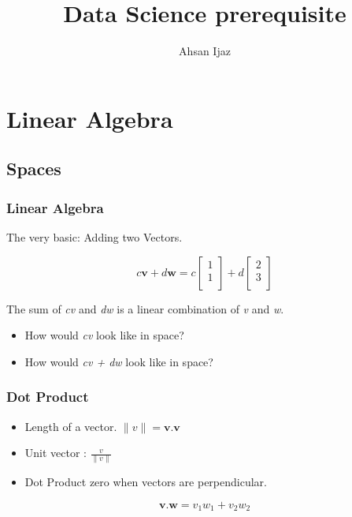 \documentclass{beamer}
\newtheorem{Key points}{Key points}
\begin{document}
\title[Linear Algebra Introduction]{Data Science prerequisite} 
\author{Ahsan Ijaz}
\date{}
 \frame{\titlepage}
\section{Linear Algebra}
\subsection{Spaces}
 \begin{frame}
   \frametitle{Linear Algebra}
   The very basic:
  Adding two Vectors.

   \begin{equation*}
     c\mathbf{v} +d\mathbf{w} = c\begin{bmatrix}
1\\ 
1\\ 
\end{bmatrix}+
d\begin{bmatrix}
2\\
3\\
\end{bmatrix}
   \end{equation*}
   \begin{definition}
     The sum of \emph{cv} and \emph{dw} is a linear combination of \emph{v} and \emph{w}.
   \end{definition}
   \begin{itemize}
   \item<2-> How would \emph{cv} look like in space?
   \item<3-> How would \emph{cv + dw} look like in space?
   \end{itemize}

 \end{frame}

 \begin{frame}
   \frametitle{Dot Product}
 \begin{itemize}
 \item Length of a vector. $\lVert{}v{}\rVert = \mathbf{v.v}$
\item Unit vector : $\frac{v}{\lVert{}v{}\rVert}$
\item Dot Product zero when vectors are perpendicular.
 \end{itemize}
   \begin{equation*}
     \mathbf{v.w}=v_1w_1+v_2w_2
   \end{equation*}
 \end{frame}
\end{document}
